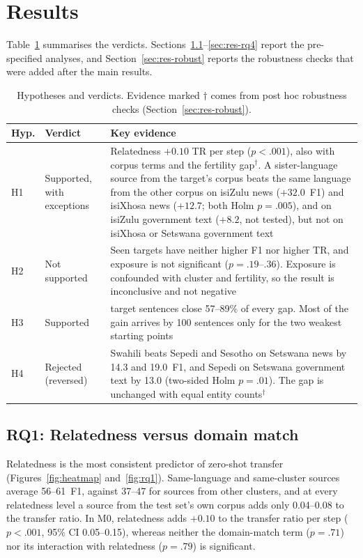 \section{Results}\label{sec:results}

Table~\ref{tab:verdicts} summarises the verdicts. Sections~\ref{sec:res-rq1}--\ref{sec:res-rq4} report the pre-specified analyses, and Section~\ref{sec:res-robust} reports the robustness checks that were added after the main results.

\begin{table}[t]
\centering\footnotesize
\caption{Hypotheses and verdicts. Evidence marked $\dagger$ comes from post hoc robustness checks (Section~\ref{sec:res-robust}).}
\label{tab:verdicts}
\begin{tabular}{@{}l>{\raggedright}p{3.2cm}>{\raggedright\arraybackslash}p{12.6cm}@{}}
\toprule
Hyp. & Verdict & Key evidence\\
\midrule
H1 & Supported, with exceptions & Relatedness $+0.10$ TR per step ($p<.001$), also with corpus terms and the fertility gap$^\dagger$. A sister-language source from the target's corpus beats the same language from the other corpus on isiZulu news ($+32.0$~F1) and isiXhosa news ($+12.7$; both Holm $p=.005$), and on isiZulu government text ($+8.2$, not tested), but not on isiXhosa or Setswana government text\\
H2 & Not supported & Seen targets have neither higher F1 nor higher TR, and exposure is not significant ($p=.19$--$.36$). Exposure is confounded with cluster and fertility, so the result is inconclusive and not negative\\
H3 & Supported & 500 target sentences close 57--89\% of every gap. Most of the gain arrives by 100 sentences only for the two weakest starting points\\
H4 & Rejected (reversed) & Swahili beats Sepedi and Sesotho on Setswana news by 14.3 and 19.0~F1, and Sepedi on Setswana government text by 13.0 (two-sided Holm $p=.01$). The gap is unchanged with equal entity counts$^\dagger$\\
\bottomrule
\end{tabular}
\end{table}

\subsection{RQ1: Relatedness versus domain match}\label{sec:res-rq1}
Relatedness is the most consistent predictor of zero-shot transfer (Figures~\ref{fig:heatmap} and~\ref{fig:rq1}). Same-language and same-cluster sources average 56--61~F1, against 37--47 for sources from other clusters, and at every relatedness level a source from the test set's own corpus adds only 0.04--0.08 to the transfer ratio. In M0, relatedness adds $+0.10$ to the transfer ratio per step ($p<.001$, 95\% CI 0.05--0.15), whereas neither the domain-match term ($p=.71$) nor its interaction with relatedness ($p=.79$) is significant.

